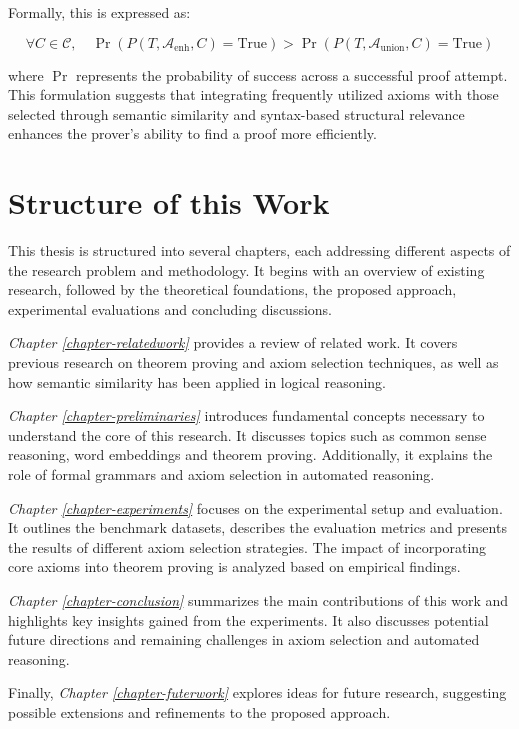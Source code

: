 \documentclass[english,version-2020-11]{uzl-thesis}
\begin{document}
Formally, this is expressed as:

\begin{equation}
    \forall C \in \mathcal{C}, \quad \Pr(P(T, \mathcal{A}_{\text{enh}}, C) = \text{True}) > \Pr(P(T, \mathcal{A}_{\text{union}}, C) = \text{True})
\end{equation}

where \( \Pr \) represents the probability of success across a successful proof attempt. This formulation suggests that integrating frequently utilized axioms with those selected through semantic similarity and syntax-based structural relevance enhances the prover’s ability to find a proof more efficiently.


\section{Structure of this Work}

This thesis is structured into several chapters, each addressing different aspects of the research problem and methodology. It begins with an overview of existing research, followed by the theoretical foundations, the proposed approach, experimental evaluations and concluding discussions.

\textit{Chapter \ref{chapter-relatedwork}} provides a review of related work. It covers previous research on theorem proving and axiom selection techniques, as well as how semantic similarity has been applied in logical reasoning.

\textit{Chapter \ref{chapter-preliminaries}} introduces fundamental concepts necessary to understand the core of this research. It discusses topics such as common sense reasoning, word embeddings and theorem proving. Additionally, it explains the role of formal grammars and axiom selection in automated reasoning.

\textit{Chapter \ref{chapter-experiments}} focuses on the experimental setup and evaluation. It outlines the benchmark datasets, describes the evaluation metrics and presents the results of different axiom selection strategies. The impact of incorporating core axioms into theorem proving is analyzed based on empirical findings.

\textit{Chapter \ref{chapter-conclusion}} summarizes the main contributions of this work and highlights key insights gained from the experiments. It also discusses potential future directions and remaining challenges in axiom selection and automated reasoning.

Finally, \textit{Chapter \ref{chapter-futerwork}} explores ideas for future research, suggesting possible extensions and refinements to the proposed approach.
\end{document}
